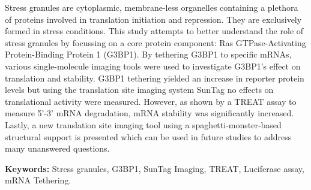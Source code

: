 Stress granules are cytoplasmic, membrane-less organelles containing a plethora of proteins involved in translation initiation and repression.
They are exclusively formed in stress conditions.
This study attempts to better understand the role of stress granules by focussing on a core protein component: Ras GTPase-Activating Protein-Binding Protein 1 (G3BP1).
By tethering G3BP1 to specific mRNAs, various single-molecule imaging tools were used to investigate G3BP1's effect on translation and stability.
G3BP1 tethering yielded an increase in reporter protein levels but using the translation site imaging system SunTag no effects on translational activity were measured.
However, as shown by a TREAT assay to measure 5'-3' mRNA degradation, mRNA stability was significantly increased.
Lastly, a new translation site imaging tool using a spaghetti-monster-based structural support is presented which can be used in future studies to address many unanswered questions.

\noindent
\textbf{Keywords:}
Stress granules, G3BP1, SunTag Imaging, TREAT, Luciferase assay, mRNA Tethering.
